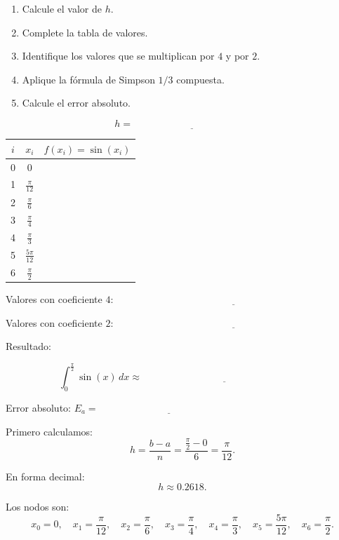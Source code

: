 \documentclass[11pt,respuestas,a4]{aleph-examen}
\begin{document}
\begin{preguntas}
\begin{enumerate}[label=\alph*)]
    \item Calcule el valor de $h$.
    \item Complete la tabla de valores.
    \item Identifique los valores que se multiplican por $4$ y por $2$.
    \item Aplique la fórmula de Simpson $1/3$ compuesta.
    \item Calcule el error absoluto.
\end{enumerate}

\[
h=\underline{\hspace{5cm}}
\]

\begin{center}
\renewcommand{\arraystretch}{1.4}
\begin{tabular}{c|c|c}
\toprule
$i$ & $x_i$ & $f(x_i)=\sin(x_i)$ \\
\midrule
0 & $0$ &  \\
1 & $\frac{\pi}{12}$ &  \\
2 & $\frac{\pi}{6}$ &  \\
3 & $\frac{\pi}{4}$ &  \\
4 & $\frac{\pi}{3}$ &  \\
5 & $\frac{5\pi}{12}$ &  \\
6 & $\frac{\pi}{2}$ &  \\
\bottomrule
\end{tabular}
\end{center}

Valores con coeficiente $4$: $
\underline{\hspace{10cm}}
$

\vspace{1cm}
Valores con coeficiente $2$: $
\underline{\hspace{10cm}}
$

Resultado:

\[
\int_0^{\frac{\pi}{2}} \sin(x)\,dx
\approx
\underline{\hspace{7cm}}
\]

Error absoluto: $
E_a=\underline{\hspace{6cm}}
$

\begin{respuesta}
Primero calculamos:
\[
h=\frac{b-a}{n}
=
\frac{\frac{\pi}{2}-0}{6}
=
\frac{\pi}{12}.
\]

En forma decimal:
\[
h\approx 0.2618.
\]

Los nodos son:
\[
x_0=0,
\quad
x_1=\frac{\pi}{12},
\quad
x_2=\frac{\pi}{6},
\quad
x_3=\frac{\pi}{4},
\quad
x_4=\frac{\pi}{3},
\quad
x_5=\frac{5\pi}{12},
\quad
x_6=\frac{\pi}{2}.
\]


\end{respuesta}
\end{preguntas}
\end{document}
